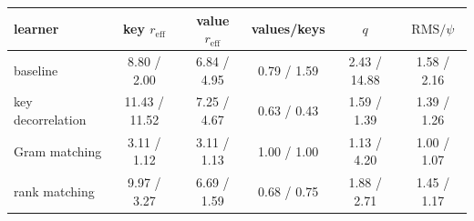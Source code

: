 \begin{tabular}{lccccc}
\toprule
learner & key $r_{\mathrm{eff}}$ & value $r_{\mathrm{eff}}$ & values/keys & $q$ & $\mathrm{RMS}/\psi$ \\
\midrule
baseline & 8.80 / 2.00 & 6.84 / 4.95 & 0.79 / 1.59 & 2.43 / 14.88 & 1.58 / 2.16 \\
key decorrelation & 11.43 / 11.52 & 7.25 / 4.67 & 0.63 / 0.43 & 1.59 / 1.39 & 1.39 / 1.26 \\
Gram matching & 3.11 / 1.12 & 3.11 / 1.13 & 1.00 / 1.00 & 1.13 / 4.20 & 1.00 / 1.07 \\
rank matching & 9.97 / 3.27 & 6.69 / 1.59 & 0.68 / 0.75 & 1.88 / 2.71 & 1.45 / 1.17 \\
\bottomrule
\end{tabular}
